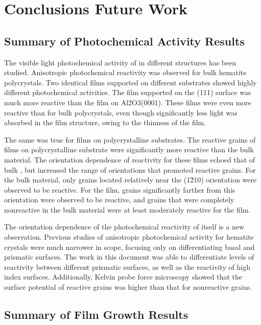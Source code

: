
\chapter{Conclusions \oldand Future Work}
\label{ch:conclusions}


\section{Summary of Photochemical Activity
Results}\label{sec:conclusions.photochemc.summary}


The visible light photochemical activity of  in different structures has been
studied. Anisotropic photochemical reactivity was observed for bulk hematite polycrystals. 
Two identical  films supported on different substrates showed highly
different photochemical activities. The film supported on the (111) surface was
much more reactive than the film on Al2O3(0001). These films were even more reactive than
for bulk  polycrystals, even though significantly less light was absorbed in the
film structure, owing to the thinness of the film. 

The same was true for films on polycrystalline  substrates. The reactive grains
of films on polycrystalline substrate were significantly more reactive than the bulk
material. The orientation dependence of reactivity for these films echoed that of bulk
, but increased the range of orientations that promoted reactive grains. For the
bulk material, only grains located relatively near the (1\={2}10) orientation were
observed to be reactive. For the film, grains significantly farther from this orientation
were observed to be reactive, and grains that were completely nonreactive in the bulk
material were at least moderately reactive for the film.

The orientation dependence of the photochemical reactivity of  itself is a new
observation. Previous studies of anisotropic photochemical activity for hematite crystals
were much narrower in scope, focusing only on differentiating basal and prismatic
surfaces. The work in this document was able to differentiate levels of reactivity between
different prismatic surfaces, as well as the reactivity of high index surfaces.
Additionally, Kelvin probe force microscopy showed that the surface potential of reactive
grains was higher than that for nonreactive grains.


\section{Summary of Film Growth Results}
\label{sec:conclusions.growth.summary}


